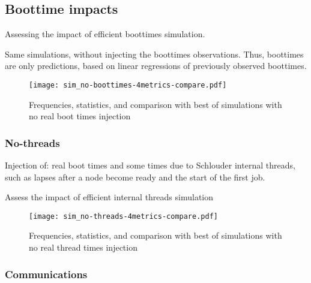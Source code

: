 \documentclass[a4paper,10pt]{article}
\newcommand\vrpath{../../lab/setup/simschlouder/validation-results/}
\begin{document}
\subsection{Boottime impacts}

Assessing the impact of efficient boottimes simulation.

Same simulations, without injecting the boottimes observations. 
Thus, boottimes are only predictions, based on linear regressions of previously
observed boottimes.

\begin{figure}
  \centering
  \texttt{[image: sim\_no-boottimes-4metrics-compare.pdf]}

  

  

  

  \caption{Frequencies, statistics, and comparison with best of simulations with no real boot times 
  injection}

\end{figure} 

\subsubsection{No-threads}

Injection of: real boot times and some times due to Schlouder internal threads, 
such as lapses after a node become ready and the start of the first job.

Assess the impact of efficient internal threads simulation

\begin{figure}
  \centering
  \texttt{[image: sim\_no-threads-4metrics-compare.pdf]}
  
  

  

  
    
  \caption{Frequencies, statistics, and comparison with best of simulations with no real thread times
  injection}
\end{figure} 



\subsubsection{Communications}
\end{document}
